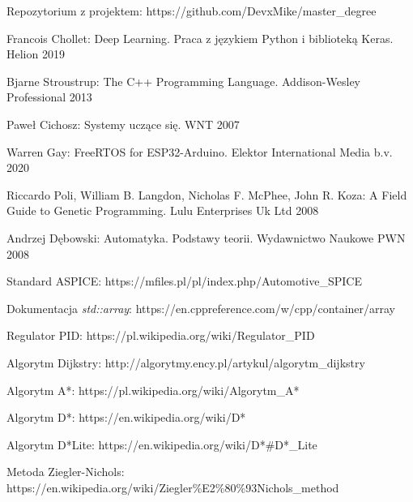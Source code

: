 \documentclass[12pt,twoside]{article}
\begin{document}
\begin{thebibliography}{15}
Repozytorium z projektem: https://github.com/DevxMike/master\_degree

 Francois Chollet: Deep Learning. Praca z językiem Python i biblioteką Keras. Helion 2019

 Bjarne Stroustrup: The C++ Programming Language. Addison-Wesley Professional 2013

 Paweł Cichosz: Systemy uczące się. WNT 2007 

 Warren Gay: FreeRTOS for ESP32-Arduino. Elektor International Media b.v. 2020

  Riccardo Poli, William B. Langdon, Nicholas F. McPhee, John R. Koza: A Field Guide to Genetic Programming. Lulu Enterprises Uk Ltd 2008

 Andrzej Dębowski: Automatyka. Podstawy teorii. Wydawnictwo Naukowe PWN 2008

Standard ASPICE: https://mfiles.pl/pl/index.php/Automotive\_SPICE

Dokumentacja \textit{std::array}: https://en.cppreference.com/w/cpp/container/array

Regulator PID: https://pl.wikipedia.org/wiki/Regulator\_PID

Algorytm Dijkstry: http://algorytmy.ency.pl/artykul/algorytm\_dijkstry

Algorytm A*: https://pl.wikipedia.org/wiki/Algorytm\_A*

Algorytm D*: https://en.wikipedia.org/wiki/D*

Algorytm D*Lite: https://en.wikipedia.org/wiki/D*\#D*\_Lite

Metoda Ziegler-Nichols: \\https://en.wikipedia.org/wiki/Ziegler\%E2\%80\%93Nichols\_method

\end{thebibliography}

\clearpage

\makesummary
\end{document}
